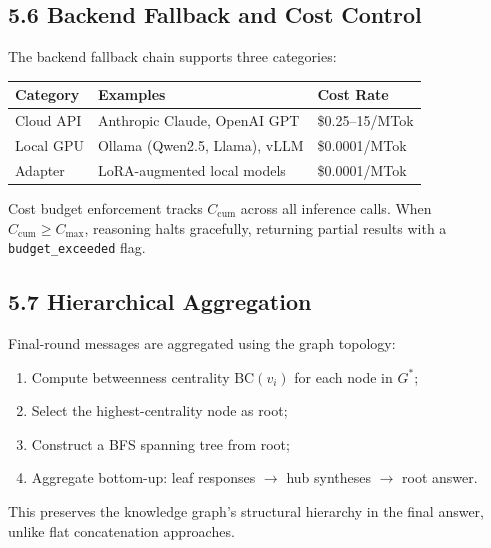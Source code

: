\documentclass[a4paper,12pt]{article}
\begin{document}
\subsection*{5.6 Backend Fallback and Cost Control}

\noindent The backend fallback chain supports three categories:

\begin{center}
\begin{tabular}{lll}
\toprule
\textbf{Category} & \textbf{Examples} & \textbf{Cost Rate} \\
\midrule
Cloud API & Anthropic Claude, OpenAI GPT & \$0.25--15/MTok \\
Local GPU & Ollama (Qwen2.5, Llama), vLLM & \$0.0001/MTok \\
Adapter & LoRA-augmented local models & \$0.0001/MTok \\
\bottomrule
\end{tabular}
\end{center}

\noindent Cost budget enforcement tracks $C_{\mathrm{cum}}$ across all inference calls. When $C_{\mathrm{cum}} \geq C_{\max}$, reasoning halts gracefully, returning partial results with a \texttt{budget\_exceeded} flag.

\subsection*{5.7 Hierarchical Aggregation}

\noindent Final-round messages are aggregated using the graph topology:

\begin{enumerate}[nosep,leftmargin=2em]
\item Compute betweenness centrality $\mathrm{BC}(v_i)$ for each node in $G^*$;
\item Select the highest-centrality node as root;
\item Construct a BFS spanning tree from root;
\item Aggregate bottom-up: leaf responses $\to$ hub syntheses $\to$ root answer.
\end{enumerate}

\noindent This preserves the knowledge graph's structural hierarchy in the final answer, unlike flat concatenation approaches.

\vspace{8mm}

\end{document}
